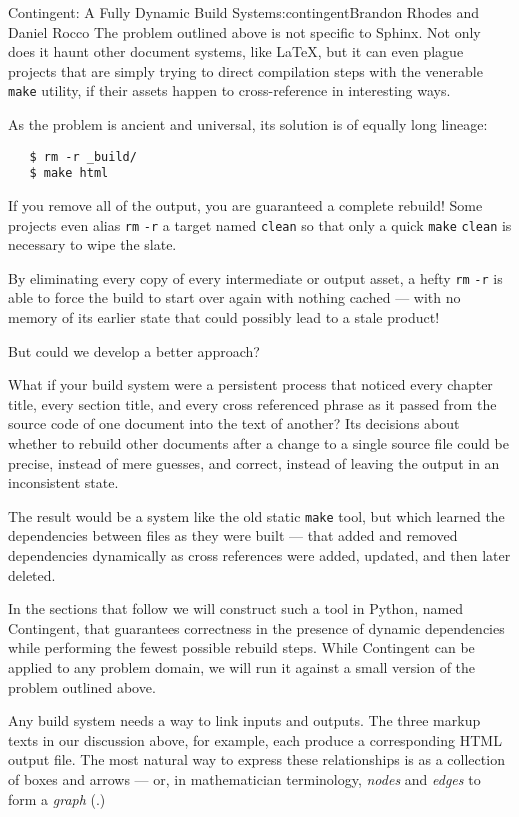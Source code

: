\begin{aosachapter}{Contingent: A Fully Dynamic Build System}{s:contingent}{Brandon Rhodes and Daniel Rocco}
The problem outlined above is not specific to Sphinx. Not only does it
haunt other document systems, like LaTeX, but it can even plague
projects that are simply trying to direct compilation steps with the
venerable \texttt{make} utility, if their assets happen to
cross-reference in interesting ways.

As the problem is ancient and universal, its solution is of equally long
lineage:

\begin{verbatim}
   $ rm -r _build/
   $ make html
\end{verbatim}

If you remove all of the output, you are guaranteed a complete rebuild!
Some projects even alias \texttt{rm} \texttt{-r} a target named
\texttt{clean} so that only a quick \texttt{make} \texttt{clean} is
necessary to wipe the slate.

By eliminating every copy of every intermediate or output asset, a hefty
\texttt{rm} \texttt{-r} is able to force the build to start over again
with nothing cached --- with no memory of its earlier state that could
possibly lead to a stale product!

But could we develop a better approach?

What if your build system were a persistent process that noticed every
chapter title, every section title, and every cross referenced phrase as
it passed from the source code of one document into the text of another?
Its decisions about whether to rebuild other documents after a change to
a single source file could be precise, instead of mere guesses, and
correct, instead of leaving the output in an inconsistent state.

The result would be a system like the old static \texttt{make} tool, but
which learned the dependencies between files as they were built --- that
added and removed dependencies dynamically as cross references were
added, updated, and then later deleted.

In the sections that follow we will construct such a tool in Python,
named Contingent, that guarantees correctness in the presence of dynamic
dependencies while performing the fewest possible rebuild steps. While
Contingent can be applied to any problem domain, we will run it against
a small version of the problem outlined above.

\label{linking-tasks-to-make-a-graph}

Any build system needs a way to link inputs and outputs. The three
markup texts in our discussion above, for example, each produce a
corresponding HTML output file. The most natural way to express these
relationships is as a collection of boxes and arrows --- or, in
mathematician terminology, \emph{nodes} and \emph{edges} to form a
\emph{graph} (.)


\end{aosachapter}
